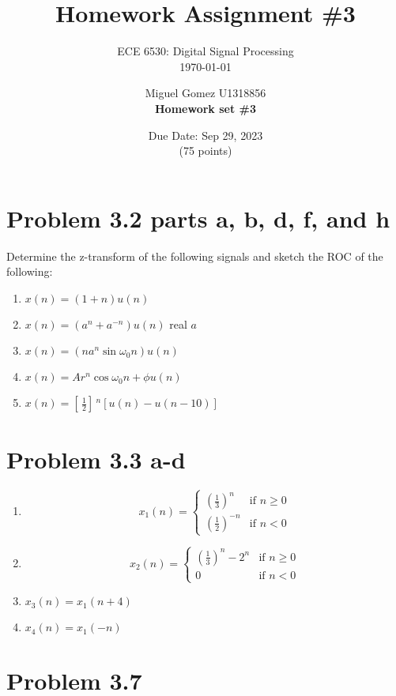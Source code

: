 \documentclass[a4paper, 11pt]{exam}
\title{Homework Assignment \#3}
\subtitle{ECE 6530: Digital Signal Processing \\
\today\\}
\author{ Miguel Gomez U1318856\\
\textbf{Homework set \#3}}
\date{Due Date: Sep 29, 2023\\
(75 points)}
\newcommand{\wfbrac}[1]{%
\left[ \,#1\right] \,
}
\newcommand{\wfparen}[1]{%
\left(#1\right)
}
\begin{document}
\maketitle
\section{Problem 3.2 parts a, b, d, f, and h}
Determine the z-transform of the following signals and sketch the ROC of the following:
\begin{enumerate}
\item $x(n) = (1+n)u(n)$
\item $x(n) = (a^{n} + a^{-n})u(n)$ real $a$
\item $x(n) = (na^{n}\sin{\omega_0n})u(n)$
\item $x(n) = Ar^n\cos{\omega_0n + \phi}u(n)$
\item $x(n) = \wfbrac{\frac{1}{2}}^{n}[u(n)-u(n-10)]$
\end{enumerate}

\begin{eqnsection}{}{}
  
\end{eqnsection}

\newpage
\section{Problem 3.3 a-d}
\begin{enumerate}
\item
\[
x_1(n) = 
\begin{cases}
\wfparen{\frac{1}{3}}^{n} & \text{if } n \geq 0\\
\wfparen{\frac{1}{2}}^{-n} & \text{if } n < 0 
\end{cases}
\]
\item
\[
x_2(n) = 
\begin{cases}
\wfparen{\frac{1}{3}}^{n} - 2^{n} & \text{if } n \geq 0\\
0 & \text{if } n < 0 
\end{cases}
\]
\item $x_3(n) = x_1(n+4)$
\item $x_4(n) = x_1(-n)$
\end{enumerate}
\section{Problem 3.7}
\end{document}
